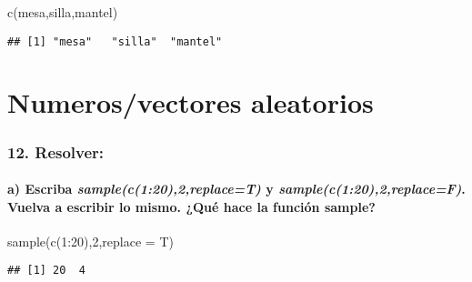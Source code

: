 \documentclass[
]{article}
\newenvironment{Shaded}{\begin{snugshade}}{\end{snugshade}}
\newcommand{\AttributeTok}[1]{\textcolor[rgb]{0.77,0.63,0.00}{#1}}
\newcommand{\DecValTok}[1]{\textcolor[rgb]{0.00,0.00,0.81}{#1}}
\newcommand{\FunctionTok}[1]{\textcolor[rgb]{0.00,0.00,0.00}{#1}}
\newcommand{\NormalTok}[1]{#1}
\newcommand{\SpecialCharTok}[1]{\textcolor[rgb]{0.00,0.00,0.00}{#1}}
\newcommand{\StringTok}[1]{\textcolor[rgb]{0.31,0.60,0.02}{#1}}
\begin{document}
\begin{Shaded}
\begin{Highlighting}[]
\FunctionTok{c}\NormalTok{(}\StringTok{\textquotesingle{}mesa\textquotesingle{}}\NormalTok{,}\StringTok{\textquotesingle{}silla\textquotesingle{}}\NormalTok{,}\StringTok{\textquotesingle{}mantel\textquotesingle{}}\NormalTok{)}
\end{Highlighting}
\end{Shaded}

\begin{verbatim}
## [1] "mesa"   "silla"  "mantel"
\end{verbatim}

\hypertarget{numerosvectores-aleatorios}{%
\section{\texorpdfstring{\textbf{Numeros/vectores
aleatorios}}{Numeros/vectores aleatorios}}\label{numerosvectores-aleatorios}}

\hypertarget{resolver-2}{%
\subsubsection{12. Resolver:}\label{resolver-2}}

\hypertarget{a-escriba-samplec1202replacet-y-samplec1202replacef.-vuelva-a-escribir-lo-mismo.-quuxe9-hace-la-funciuxf3n-sample}{%
\paragraph{\texorpdfstring{a) Escriba \emph{sample(c(1:20),2,replace=T)}
y \emph{sample(c(1:20),2,replace=F)}. Vuelva a escribir lo mismo. ¿Qué
hace la función
sample?}{a) Escriba sample(c(1:20),2,replace=T) y sample(c(1:20),2,replace=F). Vuelva a escribir lo mismo. ¿Qué hace la función sample?}}\label{a-escriba-samplec1202replacet-y-samplec1202replacef.-vuelva-a-escribir-lo-mismo.-quuxe9-hace-la-funciuxf3n-sample}}

\begin{Shaded}
\begin{Highlighting}[]
\FunctionTok{sample}\NormalTok{(}\FunctionTok{c}\NormalTok{(}\DecValTok{1}\SpecialCharTok{:}\DecValTok{20}\NormalTok{),}\DecValTok{2}\NormalTok{,}\AttributeTok{replace =}\NormalTok{ T)}
\end{Highlighting}
\end{Shaded}

\begin{verbatim}
## [1] 20  4
\end{verbatim}
\end{document}
